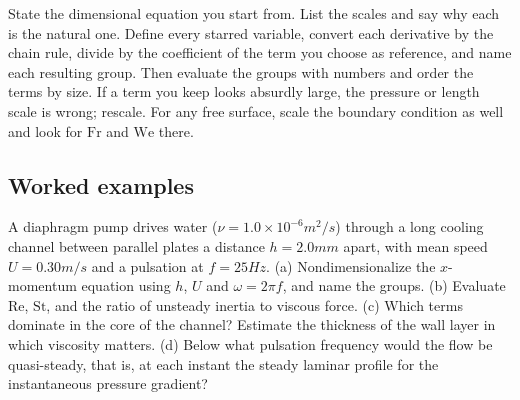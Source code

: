 \begin{firstmoves}
State the dimensional equation you start from. List the scales and say why each is the natural one. Define every starred variable, convert each derivative by the chain rule, divide by the coefficient of the term you choose as reference, and name each resulting group. Then evaluate the groups with numbers and order the terms by size. If a term you keep looks absurdly large, the pressure or length scale is wrong; rescale. For any free surface, scale the boundary condition as well and look for $\mathrm{Fr}$ and $\mathrm{We}$ there.
\end{firstmoves}

\subsection*{Worked examples}

\begin{example}
A diaphragm pump drives water ($\nu = 1.0\times10^{-6}\unit{m^2/s}$) through a long cooling channel between parallel plates a distance $h = 2.0\unit{mm}$ apart, with mean speed $U = 0.30\unit{m/s}$ and a pulsation at $f = 25\unit{Hz}$.
(a) Nondimensionalize the $x$-momentum equation using $h$, $U$ and $\omega = 2\pi f$, and name the groups.
(b) Evaluate $\mathrm{Re}$, $\mathrm{St}$, and the ratio of unsteady inertia to viscous force.
(c) Which terms dominate in the core of the channel? Estimate the thickness of the wall layer in which viscosity matters.
(d) Below what pulsation frequency would the flow be quasi-steady, that is, at each instant the steady laminar profile for the instantaneous pressure gradient?
\end{example}

